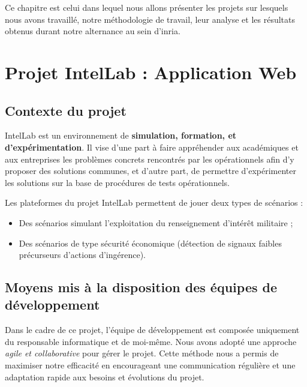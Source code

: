 \sloppy


Ce chapitre est celui dans lequel nous allons présenter les projets sur lesquels nous avons travaillé, notre méthodologie de travail, leur analyse et les résultats obtenus durant notre alternance au sein d'inria.

\section{Projet IntelLab : Application Web}

\subsection{Contexte du projet}

IntelLab est un environnement de \textbf{simulation, formation, et d’expérimentation}. Il vise d’une part à faire appréhender aux académiques et aux entreprises les problèmes concrets rencontrés par les opérationnels afin d’y proposer des solutions communes, et d’autre part, de permettre d’expérimenter les solutions sur la base de procédures de tests opérationnels.

\noindent Les plateformes du projet IntelLab permettent de jouer deux types de scénarios :

\begin{itemize}\addtolength{\itemsep}{-0.35\baselineskip}%
	\item Des scénarios simulant l'exploitation du renseignement d'intérêt militaire ;
	\item Des scénarios de type sécurité économique (détection de signaux faibles précurseurs d'actions d'ingérence).
\end{itemize}

\subsection{Moyens mis à la disposition des équipes de développement}
Dans le cadre de ce projet, l'équipe de développement est composée uniquement du responsable informatique et de moi-même. Nous avons adopté une approche \textit{agile et collaborative} pour gérer le projet.
Cette méthode nous a permis de maximiser notre efficacité en encourageant une communication régulière et une adaptation rapide aux besoins et évolutions du projet.


